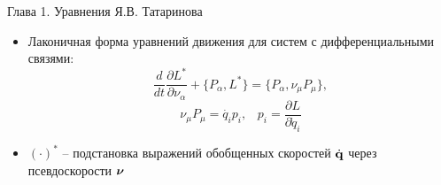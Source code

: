 \begin{frame}{Глава 1. Уравнения Я.В. Татаринова}
    \begin{itemize}
        \item {
            Лаконичная форма уравнений движения для систем с дифференциальными связями:
            \begin{equation}\label{Tatarinov}
                \frac{d}{dt}\frac{\partial L^{*}}{\partial \nu_\alpha}  + \{P_\alpha, L^{*}\} = \{P_\alpha, \nu_\mu P_\mu\},
            \end{equation}
            $$ \nu_\mu P_\mu = \dot{q_i} p_i, \hspace{10pt} p_i = \frac{\partial L}{\partial \dot{q}_i} $$
        }
        \item {
            $(\cdot)^{*}$ -- подстановка выражений обобщенных скоростей $\dot{\mathbf{q}}$ через псевдоскорости $\boldsymbol{\mathbf{\nu}}$
        }
    \end{itemize}
\end{frame}